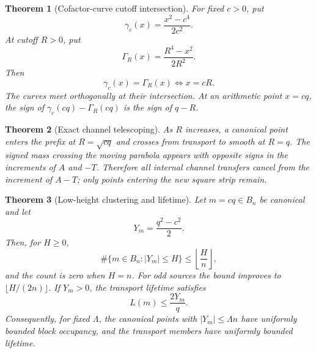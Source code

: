 \documentclass[11pt]{article}
\newtheorem{theorem}{Theorem}[section]
\theoremstyle{definition}
\theoremstyle{remark}
\newcommand{\1}{\mathbf{1}}
\begin{document}
\begin{theorem}[Cofactor-curve cutoff intersection]
\label{thm:intro-intersection}
For fixed $c>0$, put
\[
 \gamma_c(x)=\frac{x^2-c^4}{2c^2}.
\]
At cutoff $R>0$, put
\[
 \Gamma_R(x)=\frac{R^4-x^2}{2R^2}.
\]
Then
\[
 \boxed{\gamma_c(x)=\Gamma_R(x)\iff x=cR.}
\]
The curves meet orthogonally at their intersection.  At an arithmetic point $x=cq$, the sign of $\gamma_c(cq)-\Gamma_R(cq)$ is the sign of $q-R$.
\end{theorem}

\begin{theorem}[Exact channel telescoping]
\label{thm:intro-telescoping}
As $R$ increases, a canonical point enters the prefix at $R=\sqrt{cq}$ and crosses from transport to smooth at $R=q$.  The signed mass crossing the moving parabola appears with opposite signs in the increments of $A$ and $-T$.  Therefore all internal channel transfers cancel from the increment of $A-T$; only points entering the new square strip remain.
\end{theorem}

\begin{theorem}[Low-height clustering and lifetime]
\label{thm:intro-low}
Let $m=cq\in B_n$ be canonical and let
\[
 Y_m=\frac{q^2-c^2}{2}.
\]
Then, for $H\ge0$,
\[
 \#\{m\in B_n:|Y_m|\le H\}
 \le\left\lfloor\frac{H}{n}\right\rfloor,
\]
and the count is zero when $H=n$.  For odd sources the bound improves to
$\lfloor H/(2n)\rfloor$.
If $Y_m>0$, the transport lifetime satisfies
\[
 L(m)\le\frac{2Y_m}{q}.
\]
Consequently, for fixed $\Lambda$, the canonical points with $|Y_m|\le\Lambda n$ have uniformly bounded block occupancy, and the transport members have uniformly bounded lifetime.
\end{theorem}
\end{document}
